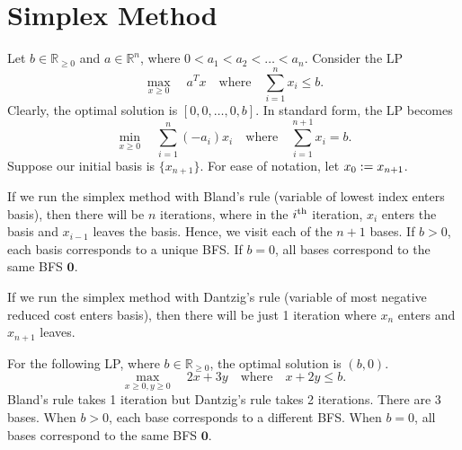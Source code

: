 \documentclass[a4paper,12pt,fleqn]{article}
\begin{document}
\section{Simplex Method}

\begin{example}
Let $b \in \mathbb{R}_{\ge 0}$ and $a \in \mathbb{R}^n$, where $0 < a_1 < a_2 < \ldots < a_n$.
Consider the LP \[ \max_{x \ge 0}\quad a^Tx \quad\textrm{where}\quad \sum_{i=1}^n x_i \le b. \]
Clearly, the optimal solution is $[0, 0, \ldots, 0, b]$.
In standard form, the LP becomes
\[ \min_{x \ge 0}\quad \sum_{i=1}^n (-a_i)x_i \quad\textrm{where}\quad \sum_{i=1}^{n+1} x_i = b. \]
Suppose our initial basis is $\{x_{n+1}\}$. For ease of notation, let $x_0 := x_{n+1}$.

If we run the simplex method with Bland's rule (variable of lowest index enters basis),
then there will be $n$ iterations, where in the $i^{\textrm{th}}$ iteration,
$x_i$ enters the basis and $x_{i-1}$ leaves the basis.
Hence, we visit each of the $n+1$ bases.
If $b > 0$, each basis corresponds to a unique BFS.
If $b = 0$, all bases correspond to the same BFS $\mathbf{0}$.

If we run the simplex method with Dantzig's rule (variable of most negative reduced cost enters basis),
then there will be just 1 iteration where $x_n$ enters and $x_{n+1}$ leaves.
\end{example}

\begin{example}
For the following LP, where $b \in \mathbb{R}_{\ge 0}$, the optimal solution is $(b, 0)$.
\[ \max_{x \ge 0, y \ge 0}\quad 2x+3y \quad\textrm{where}\quad x + 2y \le b. \]
Bland's rule takes 1 iteration but Dantzig's rule takes 2 iterations.
There are 3 bases. When $b > 0$, each base corresponds to a different BFS.
When $b = 0$, all bases correspond to the same BFS $\mathbf{0}$.
\end{example}

\end{document}
